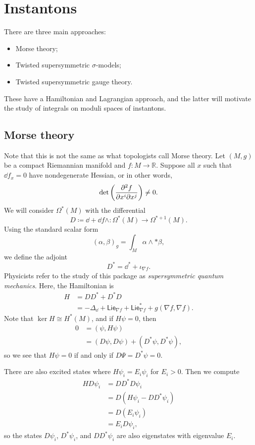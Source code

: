 \documentclass[leqno, openany]{memoir}
\theoremstyle{definition}
\theoremstyle{remark}
\theoremstyle{plain}
\theoremstyle{definition}
\theoremstyle{remark}
\newcommand{\R}{\mathbb{R}}
\newcommand{\ms}[1]{\mathsf{#1}}
\begin{document}
\chapter{Instantons}%
\label{cha:Instantons}

There are three main approaches:
\begin{itemize}
    \item Morse theory;
    \item Twisted supersymmetric $\sigma$-models;
    \item Twisted supersymmetric gauge theory.
\end{itemize}

These have a Hamiltonian and Lagrangian approach, and the latter will motivate the study of integrals on moduli spaces of instantons.

\section{Morse theory}

Note that this is not the same as what topologists call Morse theory. Let $(M,g)$ be a compact Riemannian manifold and $f \colon M \to \R$. Suppose all $x$ such that $\dd{f}_x = 0$ have nondegenerate Hessian, or in other words,
\[ \det \qty(\pdv[2]{f}{x^i}{x^j}) \neq 0. \]
We will consider $\Omega^*(M)$ with the differential
\[ D \coloneqq \dd + \dd{f} \wedge \colon \Omega^*(M) \to \Omega^{*+1}(M). \]
Using the standard scalar form
\[ (\alpha,\beta)_g = \int_M \alpha \wedge * \beta, \]
we define the adjoint
\[ D^* = \dd^* + \iota_{\nabla f}. \]
Physicists refer to the study of this package as \textit{supersymmetric quantum mechanics}. Here, the Hamiltonian is
\begin{align*}
    H &= DD^* + D^*D \\
    &= -\Delta_{\dd} + \ms{Lie}_{\nabla f} + \ms{Lie}^*_{\nabla f} + g(\nabla f, \nabla f).
\end{align*}
Note that $\ker H \cong H^*(M)$, and if $H\psi = 0$, then
\begin{align*}
    0 &= (\psi, H \psi) \\
    &= (D\psi, D\psi) + (D^* \psi, D^*\psi),
\end{align*}
so we see that $H\psi = 0$ if and only if $D \Psi = D^*\psi = 0$.

There are also excited states where $H \psi_i = E_i \psi_i$ for $E_i > 0$. Then we compute
\begin{align*}
    H D\psi_i &= DD^* D\psi_i \\
    &= D(H \psi_i - DD^* \psi_i) \\
    &= D(E_i \psi_i) \\
    &= E_i D \psi_i,
\end{align*}
so the states $D\psi_i$, $D^*\psi_i$, and $DD^* \psi_i$ are also eigenstates with eigenvalue $E_i$.
\end{document}
